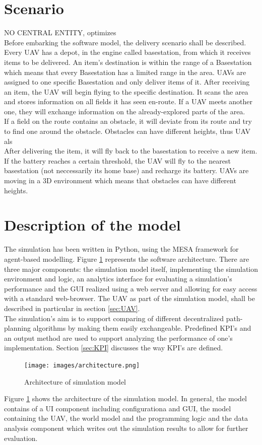 \section{Scenario}
NO CENTRAL ENTITY, optimizes
\\
Before embarking the software model, the delivery scenario shall be described.  Every UAV has a depot, in the engine called basestation, from which it receives items to be delivered. An item's destination is within the range of a Basestation which means that every Basestation has a limited range in the area. UAVs are assigned to one specific Basestation and only deliver items of it. After receiving an item, the UAV will begin flying to the specific destination. It scans the area and stores information on all fields it has seen en-route. If a UAV meets another one, they will exchange information on the already-explored parts of the area.\\
If a field on the route contains an obstacle, it will deviate from its route and try to find one around the obstacle. Obstacles can have different heights, thus UAV als\\
After delivering the item, it will fly back to the basestation to receive a new item. If the battery reaches a certain threshold, the UAV will fly to the nearest basestation (not neccessarily its home base) and recharge its battery. 
 UAVs are moving in a 3D environment which means that obstacles can have different heights.

\section{Description of the model}
The simulation has been written in Python, using the MESA framework for agent-based modelling. Figure \ref{fig:architecture} represents the software architecture. There are three major components: the simulation model itself, implementing the simulation environment and logic, an analytics interface for evaluating a simulation's performance and the GUI realized using a web server and allowing for easy access with a standard web-browser. The UAV as part of the simulation model, shall be described in particular in section \ref{sec:UAV}.\\
The simulation's aim is to support comparing of different decentralized path-planning algorithms by making them easily exchangeable. Predefined KPI's and an output method are used to support analyzing the performance of one's implementation. Section \ref{sec:KPI} discusses the way KPI's are defined.\\
\begin{figure}[htbp]\label{fig:architecture}
	\centering
	\texttt{[image: images/architecture.png]} 
	\caption{Architecture of simulation model}
\end{figure}
Figure \ref{fig:architecture} shows the architecture of the simulation model. In general, the model contains of a UI component including configurationa and GUI, the model containing the UAV, the world model and the programming logic and the data analysis component which writes out the simulation results to allow for further evaluation. 


